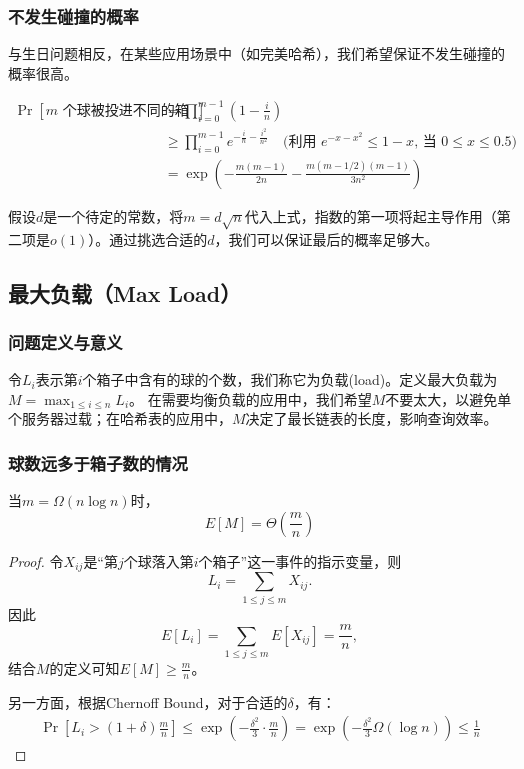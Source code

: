 \documentclass[lang=cn,newtx,10pt,scheme=chinese,chinesefont=nofont,citestyle=gb7714-2015, bibstyle=gb7714-2015]{elegantbook}
\begin{document}
\begin{refsection}
\subsubsection{不发生碰撞的概率}

与生日问题相反，在某些应用场景中（如完美哈希），我们希望保证不发生碰撞的概率很高。

\begin{align*}
\Pr[\text{$m$ 个球被投进不同的箱子}] &= \prod_{i=0}^{m-1}\left(1-\frac{i}{n}\right) \\
&\ge \prod_{i=0}^{m-1}e^{-\frac{i}{n} - \frac{i^2}{n^2}} \quad \text{(利用 $e^{-x-x^2} \le 1-x$, 当 $0 \le x \le 0.5$)} \\
&= \exp\left(-\frac{m(m-1)}{2n}-\frac{m(m-1/2)(m-1)}{3n^2}\right)
\end{align*}

假设$d$是一个待定的常数，将$m=d\sqrt{n}$代入上式，指数的第一项将起主导作用（第二项是$o(1)$）。通过挑选合适的$d$，我们可以保证最后的概率足够大。
\subsection{最大负载（Max Load）}
\subsubsection{问题定义与意义}

令$L_i$表示第$i$个箱子中含有的球的个数，我们称它为负载(load)。定义最大负载为$M=\max_{1\le i\le n}L_i$。
在需要均衡负载的应用中，我们希望$M$不要太大，以避免单个服务器过载；在哈希表的应用中，$M$决定了最长链表的长度，影响查询效率。

\subsubsection{球数远多于箱子数的情况}

\begin{theorem}
当$m=\Omega(n\log n)$时，
\begin{equation}
E[M] = \Theta\left(\frac{m}{n}\right)
\end{equation}
\end{theorem}

\begin{proof}
令$X_{ij}$是“第$j$个球落入第$i$个箱子”这一事件的指示变量，则
\[
L_i=\sum_{1\le j\le m}X_{ij}.
\]
因此
\[
E[L_i]=\sum_{1\le j\le m}E[X_{ij}] = \frac{m}{n},
\]
结合$M$的定义可知$E[M]\ge\frac{m}{n}$。

另一方面，根据Chernoff Bound，对于合适的$\delta$，有：
\begin{align*}
\Pr\left[L_i>(1+\delta)\frac{m}{n}\right] \le \exp\left(-\frac{\delta^2}{3}\cdot\frac{m}{n}\right) = \exp\left(-\frac{\delta^2}{3}\Omega(\log n)\right) \le \frac{1}{n}
\end{align*}


\end{proof}
\end{refsection}
\end{document}
